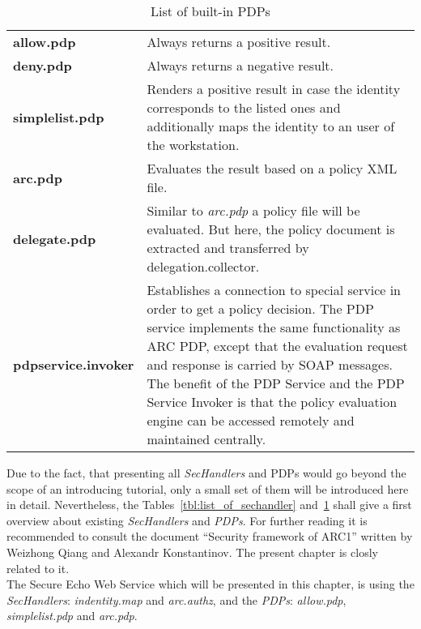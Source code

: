   \begin{table}[htb]
  \centering
  \caption{List of built-in PDPs}
\label{tbl:list_of_pdps}
  \begin{tabular*}{\textwidth}[t]{p{4cm}p{11cm}}
	\hline
 	\textbf{allow.pdp}           & Always returns a positive result.\\
	\textbf{deny.pdp}            & Always returns a negative result.\\
 	\textbf{simplelist.pdp}      & Renders a positive result in case the identity corresponds to the listed ones and additionally 
                                       maps the identity to an user of the workstation.\\
 	\textbf{arc.pdp}             & Evaluates the result based on a policy XML file.\\
 	\textbf{delegate.pdp}        & Similar to \textit{arc.pdp} a policy file will be evaluated. But here, the policy document is 
                                       extracted and transferred
                                       by delegation.collector.\\
 	\textbf{pdpservice.invoker}  & Establishes a connection to special service in order to get a policy decision. The PDP service 
                                       implements the same functionality as ARC PDP, except that the evaluation request and 
                                       response is carried by SOAP messages. The benefit of the PDP Service and the PDP Service
                                       Invoker is that the policy evaluation engine can be accessed remotely and maintained centrally.
\\
	\hline
  \end{tabular*}
  \end{table}
%
%
Due to the fact, that presenting all \textit{SecHandlers} and PDPs would go beyond the scope of an introducing tutorial, only a small set of them will be introduced here in detail. 
Nevertheless, the Tables~\ref{tbl:list_of_sechandler} and~\ref{tbl:list_of_pdps} shall give a first overview about existing \textit{SecHandlers} and \textit{PDPs}. For further reading it is recommended to consult the document ``Security framework of ARC1'' written by Weizhong Qiang and Alexandr Konstantinov. The present chapter is closly related to it.\\


The Secure Echo Web Service which will be presented in this chapter, is using the \textit{SecHandlers}: \textit{indentity.map} and \textit{arc.authz}, and the \textit{PDPs}: \textit{allow.pdp}, \textit{simplelist.pdp} and \textit{arc.pdp}. \\


